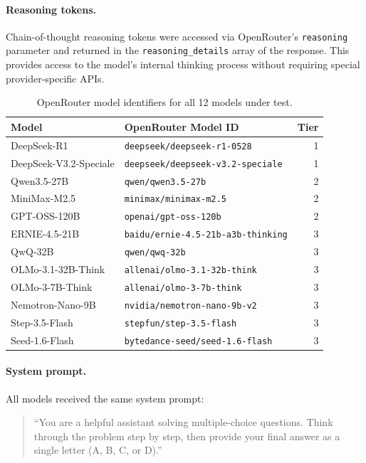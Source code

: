 \paragraph{Reasoning tokens.} Chain-of-thought reasoning tokens were accessed via OpenRouter's \texttt{reasoning} parameter and returned in the \texttt{reasoning\_details} array of the response. This provides access to the model's internal thinking process without requiring special provider-specific APIs.

\begin{table}[H]
  \centering
  \caption{OpenRouter model identifiers for all 12 models under test.}
  \label{tab:model_ids}
  \small
  \begin{tabular}{llr}
    \toprule
    \textbf{Model} & \textbf{OpenRouter Model ID} & \textbf{Tier} \\
    \midrule
    DeepSeek-R1           & \texttt{deepseek/deepseek-r1-0528}            & 1 \\
    DeepSeek-V3.2-Speciale & \texttt{deepseek/deepseek-v3.2-speciale}     & 1 \\
    \midrule
    Qwen3.5-27B           & \texttt{qwen/qwen3.5-27b}                     & 2 \\
    MiniMax-M2.5          & \texttt{minimax/minimax-m2.5}                  & 2 \\
    GPT-OSS-120B          & \texttt{openai/gpt-oss-120b}                   & 2 \\
    \midrule
    ERNIE-4.5-21B         & \texttt{baidu/ernie-4.5-21b-a3b-thinking}      & 3 \\
    QwQ-32B               & \texttt{qwen/qwq-32b}                          & 3 \\
    OLMo-3.1-32B-Think    & \texttt{allenai/olmo-3.1-32b-think}            & 3 \\
    OLMo-3-7B-Think       & \texttt{allenai/olmo-3-7b-think}               & 3 \\
    Nemotron-Nano-9B      & \texttt{nvidia/nemotron-nano-9b-v2}            & 3 \\
    Step-3.5-Flash        & \texttt{stepfun/step-3.5-flash}                & 3 \\
    Seed-1.6-Flash        & \texttt{bytedance-seed/seed-1.6-flash}         & 3 \\
    \bottomrule
  \end{tabular}
\end{table}

\paragraph{System prompt.} All models received the same system prompt:
\begin{quote}
``You are a helpful assistant solving multiple-choice questions. Think through the problem step by step, then provide your final answer as a single letter (A, B, C, or D).''
\end{quote}
